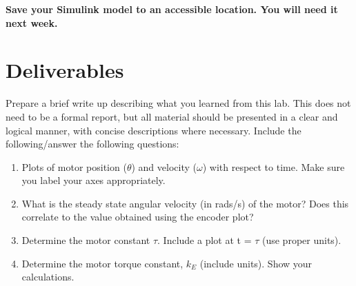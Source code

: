 \textbf{Save your Simulink model to an accessible location. You will need it next week.}

\section{Deliverables}

Prepare a brief write up describing what you learned from this lab.
This does not need to be a formal report, but all material should be presented in
a clear and logical manner, with concise descriptions where necessary. Include
the following/answer the following questions:
\begin{enumerate}
    \item Plots of motor position (\(\theta \)) and velocity (\(\omega \)) with respect to time. Make sure you label your axes appropriately.
    \item What is the steady state angular velocity (in rads/s) of the motor?
          Does this correlate to the value obtained using the encoder plot?
    \item Determine the motor constant \(\tau \). Include a plot at t = \(\tau \) (use proper units).
    \item Determine the motor torque constant, \(k_E\) (include units). Show your calculations.
\end{enumerate}

